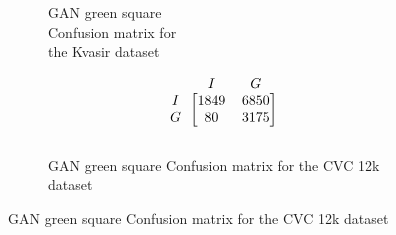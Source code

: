 \begin{figure}[h]
\begin{subfigure}[b]{0.49\textwidth}
        
\caption{GAN green square\\ Confusion matrix for \\the Kvasir dataset}
\label{mat:kvasir_CM_DN121_GAN_SQUARE}
\end{subfigure}
\begin{subfigure}[b]{0.25\textwidth}
        \[
\begin{blockarray}{ccc}
& I & G  \\
\begin{block}{c[cc]}
 		I&1849 & 6850\\
        G&  80 & 3175\\
\end{block}
\end{blockarray}
\]   
\caption{GAN green square Confusion matrix for the CVC 12k dataset}
\label{mat:cvc12k_CM_DN121_GAN_SQUARE}
\end{subfigure}

\vspace{1cm}


\end{figure}
